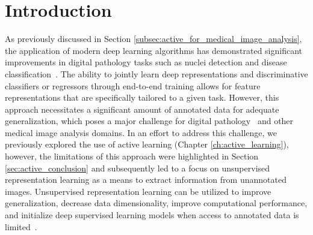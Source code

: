 \section{Introduction}
\label{sec:unsupervised_intro}
As previously discussed in Section \ref{subsec:active_for_medical_image_analysis}, the application of modern deep learning algorithms has demonstrated significant improvements in digital pathology tasks such as nuclei detection and disease classification~\citep{litjens2017survey}. The ability to jointly learn deep representations and discriminative classifiers or regressors through end-to-end training allows for feature representations that are specifically tailored to a given task. However, this approach necessitates a significant amount of annotated data for adequate generalization, which poses a major challenge for digital pathology~\citep{madabhushi2016image} and other medical image analysis domains. In an effort to address this challenge, we previously explored the use of active learning (Chapter \ref{ch:active_learning}), however, the limitations of this approach were highlighted in Section \ref{sec:active_conclusion} and subsequently led to a focus on unsupervised representation learning as a means to extract information from unannotated images. Unsupervised representation learning can be utilized to improve generalization, decrease data dimensionality, improve computational performance, and initialize deep supervised learning models when access to annotated data is limited~\citep{bengio2013representation}.

